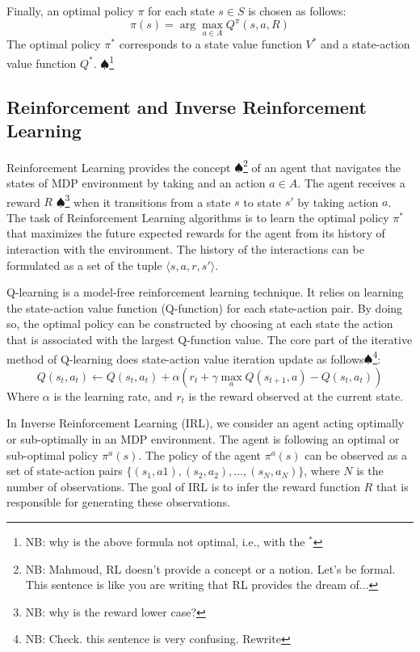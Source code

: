 \documentclass[letterpaper, 10 pt, conference]{ieeeconf}  %
\newcommand\NB[1]{$\spadesuit$\footnote{NB: #1}}
\begin{document}
Finally, an optimal policy $\pi$ for each state $s \in S$ is chosen as follows:
\begin{equation}
\pi(s) = \arg\!\max_{a\in A} Q^\pi(s,a,R)
\end{equation}
The optimal policy $\pi^*$ corresponds to a state value function $V^*$ and a state-action value function $Q^*$. \NB{why is the above formula not optimal, i.e., with the $^*$}

\subsection{Reinforcement and Inverse Reinforcement Learning}
Reinforcement Learning provides the concept \NB{Mahmoud, RL doesn't provide a concept or a notion. Let's be formal. This sentence is like you are writing that RL provides the dream of...} of an agent that navigates the states of MDP environment by taking and an action $a \in A$. The agent receives a reward $R$ \NB{why is the reward lower case?} when it transitions from a state $s$ to state $s'$ by taking action $a$. The task of Reinforcement Learning algorithms is to learn the optimal policy $\pi^*$ that maximizes the future expected rewards for the agent from its history of interaction with the environment. The history of the interactions can be formulated as a set of the tuple $\big \langle s,a,r,s' \big \rangle$.

Q-learning is a model-free reinforcement learning technique. It relies on learning the state-action value function (Q-function) for each state-action pair. By doing so, the optimal policy can be constructed by choosing at each state the action that is associated with the largest Q-function value. The core part of the iterative method of Q-learning does state-action value iteration update as follows\NB{Check. this sentence is very confusing. Rewrite}:
\begin{equation}
    Q(s_t,a_t) \leftarrow Q(s_t,a_t) + \alpha ( r_t + \gamma \max_{a} Q(s_{t+1},a) - Q(s_t,a_t))
\end{equation}
Where $\alpha$ is the learning rate, and $r_t$ is the reward observed at the current state.

In Inverse Reinforcement Learning (IRL), we consider an agent acting optimally or sub-optimally in an MDP environment. The agent is following an optimal or sub-optimal policy $\pi^a(s)$. The policy of the agent $\pi^a(s)$ can be observed as a set of state-action pairs $\{(s_1,a1),(s_2,a_2), ...,(s_N,a_N)\}$, where $N$ is the number of observations. The goal of IRL is to infer the reward function $R$ that is responsible for generating these observations.%
\end{document}
